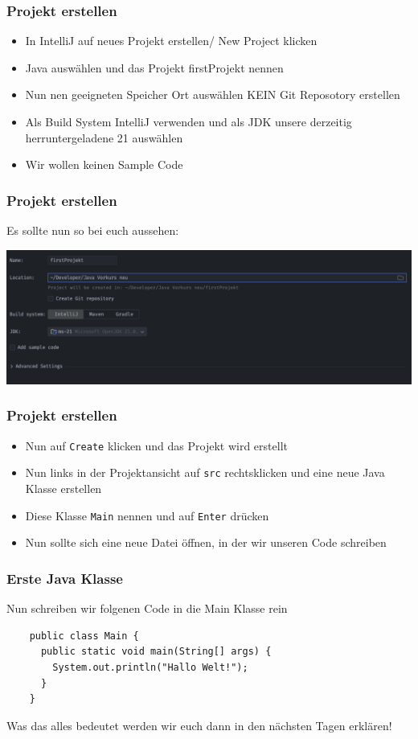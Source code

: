 \documentclass{../../presentation}
\begin{document}
\begin{frame}
  \frametitle{Projekt erstellen}
  \begin{itemize}
    \item In IntelliJ auf neues Projekt erstellen/ New Project klicken
    \item Java auswählen und das Projekt firstProjekt nennen
    \item Nun nen geeigneten Speicher Ort auswählen \achtung{} KEIN Git Reposotory erstellen
    \item Als Build System IntelliJ verwenden und als JDK unsere derzeitig herruntergeladene 21 auswählen
    \item Wir wollen keinen Sample Code
  \end{itemize}
\end{frame}

\begin{frame}
  \frametitle{Projekt erstellen}
  Es sollte nun so bei euch aussehen:

  \vspace{1cm}

  \includegraphics[width=1\linewidth]{img/projektCreation.png}
\end{frame}

\begin{frame}
  \frametitle{Projekt erstellen}
  \begin{itemize}
    \item Nun auf \texttt{Create} klicken und das Projekt wird erstellt
    \item Nun links in der Projektansicht auf \texttt{src} rechtsklicken und eine neue Java Klasse erstellen
    \item Diese Klasse \texttt{Main} nennen und auf \texttt{Enter} drücken
    \item Nun sollte sich eine neue Datei öffnen, in der wir unseren Code schreiben
  \end{itemize}
\end{frame}

\begin{frame}[fragile]
  \frametitle{Erste Java Klasse}
  Nun schreiben wir folgenen Code in die Main Klasse rein
  \begin{verbatim}
    public class Main {
      public static void main(String[] args) {
        System.out.println("Hallo Welt!");
      }
    }
  \end{verbatim}
  \achtung{} Was das alles bedeutet werden wir euch dann in den nächsten Tagen erklären!
\end{frame}
\end{document}
